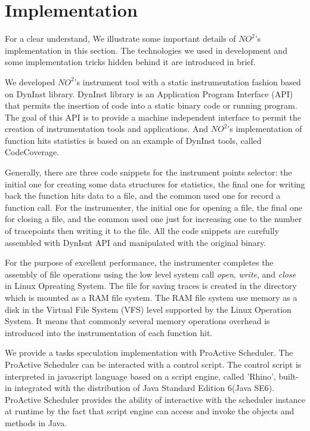 \section{Implementation}

For a clear understand, We illustrate some important details of $NO^2$'s implementation in this section. The technologies we used in development and some implementation tricks hidden behind it are introduced in brief.

We developed $NO^2$'s instrument tool with a static instrumentation fashion based on DynInst \cite{_paradyn/dyninst_????} library. DynInst library is an Application Program Interface (API) that permits the insertion of code into a static binary code or running program. The goal of this API is to provide a machine independent interface to permit the creation of instrumentation tools and applications. And $NO^2$'s implementation of function hits statistics is based on an example of DynInst tools, called CodeCoverage.

Generally, there are three code snippets for the instrument points selector: the initial one for creating some data structures for statistics, the final one for writing back the function hits data to a file, and the common used one for record a function call. For the instrumenter, the initial one for opening a file, the final one for closing a file, and the common used one just for increasing one to the number of tracepoints then writing it to the file. All the code snippets are carefully assembled with DynIsnt API and manipulated with the original binary.

For the purpose of excellent performance, the instrumenter completes the assembly of file operations using the low level system call \emph{open}, \emph{write}, and \emph{close} in Linux Opreating System. The file for saving traces is created in the directory which is mounted as a RAM file system. The RAM file system use memory as a disk in the Virtual File System (VFS) level supported by the Linux Operation System. It means that commonly several memory operations overhead is introduced into the instrumentation of each function hit.

We provide a tasks speculation implementation with ProActive Scheduler. The ProActive Scheduler can be interacted with a control script. The control script is interpreted in javascript language based on a script engine, called 'Rhino', built-in integrated with the distribution of Java Standard Edition 6(Java SE6). ProActive Scheduler provides the ability of interactive with the scheduler instance at runtime by the fact that script engine can access and invoke the objects and methods in Java.

